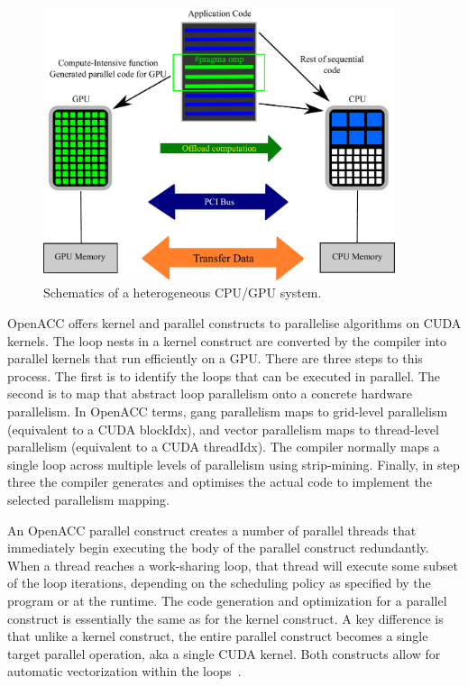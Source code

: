 \begin{figure}[tbhp]
	\centering
	\includegraphics[width=0.92\textwidth]{GPU_Concept}
	\caption{Schematics of a heterogeneous CPU/GPU system.}
	\label{fig:GPUConcept}
\end{figure}

OpenACC offers kernel and parallel constructs to parallelise algorithms on CUDA 
kernels. The loop nests in a kernel construct are converted by the compiler 
into parallel kernels that run efficiently on a GPU. There are three steps to 
this process. The first is to identify the loops that can be executed 
in parallel. The second is to map that abstract loop parallelism onto a 
concrete hardware parallelism. In OpenACC terms, gang parallelism maps to 
grid-level parallelism (equivalent to a CUDA blockIdx), and vector parallelism 
maps to thread-level parallelism (equivalent to a CUDA threadIdx). The compiler 
normally maps a single loop across multiple levels of parallelism using 
strip-mining. Finally, in step three the compiler generates and optimises the 
actual code to implement the selected parallelism mapping.

An OpenACC parallel construct creates a number of parallel threads that 
immediately begin executing the body of the parallel construct redundantly. 
When a thread reaches a work-sharing loop, that thread will execute some subset 
of the loop iterations, depending on the scheduling policy as specified by the 
program or at the runtime. The code generation and optimization for a parallel 
construct is essentially the same as for the kernel construct. A key 
difference is that unlike a kernel construct, the entire parallel construct 
becomes a single target parallel operation, aka a single CUDA kernel. Both 
constructs allow for automatic vectorization within the loops~\citep{Wolfe2012}.

